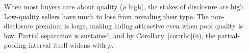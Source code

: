When most buyers care about quality ($\rho$ high), the stakes of disclosure are high. Low-quality sellers have much to lose from revealing their type. The non-disclosure premium is large, making hiding attractive even when pool quality is low. Partial separation is sustained, and by Corollary~\ref{cor:rho}(ii), the partial-pooling interval itself widens with $\rho$.

